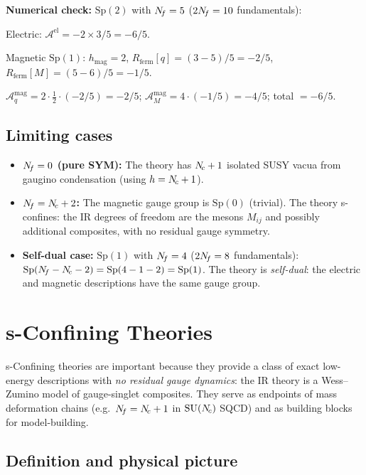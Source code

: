 \documentclass[11pt,a4paper]{article}
\newcommand{\Sp}[1]{\mathrm{Sp}(#1)}
\begin{document}
\textbf{Numerical check:} $\Sp{2}$ with $N_{\!f} = 5$ ($2N_{\!f} = 10$
fundamentals):

Electric: $\mathcal{A}^{\text{el}} = -2 \times 3/5 = -6/5$.

Magnetic $\Sp{1}$: $h_{\text{mag}} = 2$,
$R_{\text{ferm}}[q] = (3 - 5)/5 = -2/5$,
$R_{\text{ferm}}[M] = (5 - 6)/5 = -1/5$.

$\mathcal{A}^{\text{mag}}_q = 2 \cdot \tfrac{1}{2} \cdot (-2/5)
= -2/5$;
$\mathcal{A}^{\text{mag}}_M = 4 \cdot (-1/5) = -4/5$;
total $= -6/5$.\quad\checkmark

\subsection{Limiting cases}

\begin{itemize}
  \item \textbf{$N_{\!f} = 0$ (pure SYM):}
    The theory has $N_{\!c} + 1$ isolated SUSY vacua from gaugino
    condensation (using $h = N_{\!c} + 1$).
  \item \textbf{$N_{\!f} = N_{\!c} + 2$:}
    The magnetic gauge group is $\Sp{0}$ (trivial).  The theory
    s-confines: the IR degrees of freedom are the mesons
    $M_{ij}$ and possibly additional composites, with no residual
    gauge symmetry.
  \item \textbf{Self-dual case:}
    $\Sp{1}$ with $N_{\!f} = 4$ ($2N_{\!f} = 8$ fundamentals):
    $\Sp{\Nf - \Nc - 2} = \Sp{4 - 1 - 2} = \Sp{1}$.
    The theory is \emph{self-dual}: the electric and magnetic
    descriptions have the same gauge group.
\end{itemize}


\section{s-Confining Theories}
\label{sec:s-confinement}

s-Confining theories are important because they provide a class of exact
low-energy descriptions with \emph{no residual gauge dynamics}: the IR
theory is a Wess--Zumino model of gauge-singlet composites.  They serve
as endpoints of mass deformation chains (e.g.\ $N_{\!f} = N_{\!c} + 1$ in
$\mathrm{SU}(N_{\!c})$ SQCD) and as building blocks for model-building.

\subsection{Definition and physical picture}
\end{document}
